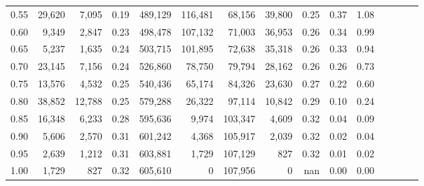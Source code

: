 \begin{tabular}{rrrcrrrrrrrrrrr}
0.55 &  29,620 &   7,095 &                                       0.19 &  489,129 &  116,481 &   68,156 &   39,800 &  0.25 &  0.37 &                         1.08 \\
0.60 &   9,349 &   2,847 &                                       0.23 &  498,478 &  107,132 &   71,003 &   36,953 &  0.26 &  0.34 &                         0.99 \\
0.65 &   5,237 &   1,635 &                                       0.24 &  503,715 &  101,895 &   72,638 &   35,318 &  0.26 &  0.33 &                         0.94 \\
0.70 &  23,145 &   7,156 &                                       0.24 &  526,860 &   78,750 &   79,794 &   28,162 &  0.26 &  0.26 &                         0.73 \\
0.75 &  13,576 &   4,532 &                                       0.25 &  540,436 &   65,174 &   84,326 &   23,630 &  0.27 &  0.22 &                         0.60 \\
0.80 &  38,852 &  12,788 &                                       0.25 &  579,288 &   26,322 &   97,114 &   10,842 &  0.29 &  0.10 &                         0.24 \\
0.85 &  16,348 &   6,233 &                                       0.28 &  595,636 &    9,974 &  103,347 &    4,609 &  0.32 &  0.04 &                         0.09 \\
0.90 &   5,606 &   2,570 &                                       0.31 &  601,242 &    4,368 &  105,917 &    2,039 &  0.32 &  0.02 &                         0.04 \\
0.95 &   2,639 &   1,212 &                                       0.31 &  603,881 &    1,729 &  107,129 &      827 &  0.32 &  0.01 &                         0.02 \\
1.00 &   1,729 &     827 &                                       0.32 &  605,610 &        0 &  107,956 &        0 &   nan &  0.00 &                         0.00 \\
\bottomrule
\end{tabular}
